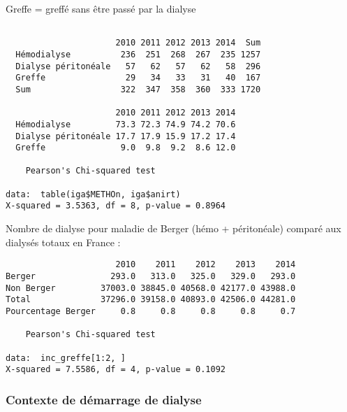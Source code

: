 \documentclass[11pt,a4paper]{article}\usepackage[]{graphicx}\usepackage[]{color}
\makeatletter
\newenvironment{kframe}{%
 \def\at@end@of@kframe{}%
 \ifinner\ifhmode%
  \def\at@end@of@kframe{\end{minipage}}%
  \begin{minipage}{\columnwidth}%
 \fi\fi%
 \def\FrameCommand##1{\hskip\@totalleftmargin \hskip-\fboxsep
 \colorbox{shadecolor}{##1}\hskip-\fboxsep
     \hskip-\linewidth \hskip-\@totalleftmargin \hskip\columnwidth}%
 \MakeFramed {\advance\hsize-\width
   \@totalleftmargin\z@ \linewidth\hsize
   \@setminipage}}%
 {\par\unskip\endMakeFramed%
 \at@end@of@kframe}
\newenvironment{knitrout}{}{} %
\makeatother
\begin{document}
Greffe = greffé sans être passé par la dialyse

\begin{knitrout}
\color{fgcolor}\begin{kframe}
\begin{verbatim}
                     
                      2010 2011 2012 2013 2014  Sum
  Hémodialyse          236  251  268  267  235 1257
  Dialyse péritonéale   57   62   57   62   58  296
  Greffe                29   34   33   31   40  167
  Sum                  322  347  358  360  333 1720
                     
                      2010 2011 2012 2013 2014
  Hémodialyse         73.3 72.3 74.9 74.2 70.6
  Dialyse péritonéale 17.7 17.9 15.9 17.2 17.4
  Greffe               9.0  9.8  9.2  8.6 12.0

	Pearson's Chi-squared test

data:  table(iga$METHOn, iga$anirt)
X-squared = 3.5363, df = 8, p-value = 0.8964
\end{verbatim}
\end{kframe}
\end{knitrout}

Nombre de dialyse pour maladie de Berger (hémo + péritonéale) comparé aux dialysés totaux en France :

\begin{knitrout}
\color{fgcolor}\begin{kframe}
\begin{verbatim}
                      2010    2011    2012    2013    2014
Berger               293.0   313.0   325.0   329.0   293.0
Non Berger         37003.0 38845.0 40568.0 42177.0 43988.0
Total              37296.0 39158.0 40893.0 42506.0 44281.0
Pourcentage Berger     0.8     0.8     0.8     0.8     0.7

	Pearson's Chi-squared test

data:  inc_greffe[1:2, ]
X-squared = 7.5586, df = 4, p-value = 0.1092
\end{verbatim}
\end{kframe}
\end{knitrout}

    \subsubsection{Contexte de démarrage de dialyse}
    
\end{document}
